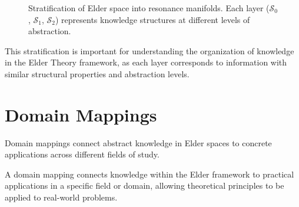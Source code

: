 \begin{figure}[ht]
\centering
{}
\caption{Stratification of Elder space into resonance manifolds. Each layer ($\mathcal{S}_0$, $\mathcal{S}_1$, $\mathcal{S}_2$) represents knowledge structures at different levels of abstraction.}
\label{fig:elder-stratification}
\end{figure}

This stratification is important for understanding the organization of knowledge in the Elder Theory framework, as each layer corresponds to information with similar structural properties and abstraction levels.

\section{Domain Mappings}

Domain mappings connect abstract knowledge in Elder spaces to concrete applications across different fields of study.

\begin{definition}
A domain mapping connects knowledge within the Elder framework to practical applications in a specific field or domain, allowing theoretical principles to be applied to real-world problems.
\end{definition}

